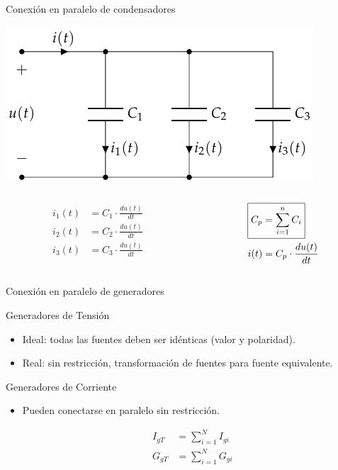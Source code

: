\documentclass[aspectratio=169, usenames,svgnames,dvipsnames]{beamer}
\begin{document}
\begin{frame}[label={sec:org78efa2b}]{Conexión en paralelo de condensadores}
\begin{center}
\includegraphics[height=0.45\textheight]{../figs/CondensadoresParalelo.pdf}
\end{center}
\begin{columns}
\begin{column}{0.5\columnwidth}
\begin{align*}
  i_1(t) &= C_1 \cdot \frac{du(t)}{dt}\\
  i_2(t) &= C_2 \cdot \frac{du(t)}{dt}\\
  i_3(t) &= C_3 \cdot \frac{du(t)}{dt}\\
\end{align*}
\end{column}
\begin{column}{0.5\columnwidth}
\begin{align*}
  \Aboxed{C_p &= \sum_{i = 1}^n C_i}\\
  i(t) &= C_p \cdot \frac{du(t)}{dt}
\end{align*}
\end{column}
\end{columns}
\end{frame}
\begin{frame}[label={sec:org2bdcc80}]{Conexión en paralelo de generadores}
\begin{block}{Generadores de Tensión}
\begin{itemize}
\item Ideal: todas las fuentes deben ser idénticas (valor y polaridad).
\item Real:  sin restricción, transformación de fuentes para fuente equivalente.
\end{itemize}
\end{block}
\begin{block}{Generadores de Corriente}
\begin{itemize}
\item Pueden conectarse en paralelo sin restricción.

\begin{align*}
  I_{gT} &= \sum_{i = 1}^N I_{gi}\\
  G_{gT} &= \sum_{i = 1}^N G_{gi}\\ 
\end{align*}
\end{itemize}
\end{block}
\end{frame}
\end{document}
